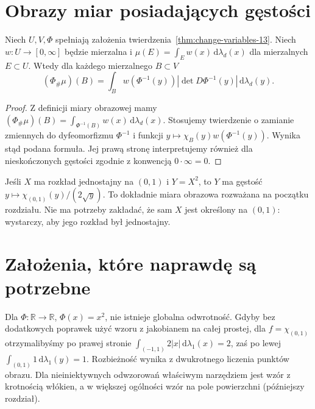 \section{Obrazy miar posiadających gęstości}
\begin{twierdzenie}
\label{thm:density-transform-13}
Niech $U,V,\Phi$ spełniają założenia
twierdzenia~\ref{thm:change-variables-13}.
Niech $w:U\to[0,\infty]$ będzie mierzalna i
$\mu(E)=\int_Ew(x)\,\mathrm d\lambda_d(x)$
dla mierzalnych $E\subset U$.
Wtedy dla każdego mierzalnego $B\subset V$
\[
(\Phi_\#\mu)(B)=\int_B
w(\Phi^{-1}(y))|\det D\Phi^{-1}(y)|\,
\mathrm d\lambda_d(y).
\]
\end{twierdzenie}
\begin{proof}
Z definicji miary obrazowej mamy
$(\Phi_\#\mu)(B)=\int_{\Phi^{-1}(B)}w(x)\,
\mathrm d\lambda_d(x)$. Stosujemy twierdzenie
o zamianie zmiennych do dyfeomorfizmu $\Phi^{-1}$
i funkcji $y\mapsto\chi_B(y)w(\Phi^{-1}(y))$.
Wynika stąd podana formuła. Jej prawą stronę
interpretujemy również dla nieskończonych gęstości
zgodnie z konwencją $0\cdot\infty=0$.
\end{proof}

\begin{przyklad}
Jeśli $X$ ma rozkład jednostajny na $(0,1)$ i
$Y=X^2$, to $Y$ ma gęstość
$y\mapsto\chi_{(0,1)}(y)/(2\sqrt y)$.
To dokładnie miara obrazowa rozważana na początku rozdziału.
Nie ma potrzeby zakładać, że sam $X$ jest określony
na $(0,1)$: wystarczy, aby jego rozkład był jednostajny.
\end{przyklad}

\section{Założenia, które naprawdę są potrzebne}
\begin{przyklad}
Dla $\Phi:\mathbb R\to\mathbb R$, $\Phi(x)=x^2$,
nie istnieje globalna odwrotność. Gdyby bez dodatkowych
poprawek użyć wzoru z jakobianem na całej prostej, dla
$f=\chi_{(0,1)}$ otrzymalibyśmy po prawej stronie
$\int_{(-1,1)}2|x|\,\mathrm d\lambda_1(x)=2$,
zaś po lewej $\int_{(0,1)}1\,\mathrm d\lambda_1(y)=1$.
Rozbieżność wynika z dwukrotnego liczenia punktów obrazu.
Dla nieiniektywnych odwzorowań właściwym narzędziem
jest wzór z krotnością włókien, a w większej ogólności
wzór na pole powierzchni (późniejszy rozdział).
\end{przyklad}

